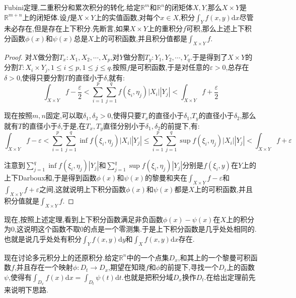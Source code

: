 Fubini定理,二重积分和累次积分的转化.给定$\mathbb{R}^m$和$\mathbb{R}^n$的闭矩体$X,Y$,那么$X\times Y$是$\mathbb{R}^{m+n}$上的闭矩体.设$f$是$X\times Y$上的实值函数,对每个$x\in X$,积分$\int_Yf(x,y)\mathrm{d}x$尽管未必存在,但是存在上下积分.先断言,如果$X\times Y$上的重积分$f$可积,那么上述上下积分函数$\phi(x)$和$\psi(x)$总是$X$上的可积函数,并且积分值都是$\int_{X\times Y}f$.
\begin{proof}
	
	对$X$做分割$T_x:X_1,X_2,\cdots,X_p$,对$Y$做分割$T_y:Y_1,Y_2,\cdots,Y_q$.于是得到了$X\times Y$的分割$T:X_i\times Y_j,1\le i\le p,1\le j\le q$.按照$f$是可积函数,于是对任意的$\varepsilon>0$,总存在$\delta>0$,使得只要分割$T$的直径小于$\delta$,就有:
	$$\int_{X\times Y}f-\frac{\varepsilon}{2}<\sum_{i=1}^{p}\sum_{j=1}^{q}f(\xi_i,\eta_j)|X_i||Y_j|<\int_{X\times Y}f+\frac{\varepsilon}{2}$$
	
	现在按照$m,n$固定,可以取$\delta_1,\delta_2>0$,使得只要$T_x$的直径小于$\delta_1$,$T_y$的直径小于$\delta_2$,那么就有$T$的直径小于$\delta$,于是,在$T_x,T_y$直径分别小于$\delta_1,\delta_2$的前提下,有:
	$$\int_{X\times Y}f-\varepsilon<\sum_{i=1}^{p}\sum_{j=1}^{q}\inf f(\xi_i,\eta_j)|X_i||Y_j|\le\sum_{i=1}^{p}\sum_{j=1}^{q}\sup f(\xi_i,\eta_j)|X_i||Y_j|<\int_{X\times Y}f+\varepsilon$$
	
	注意到$\sum_{j=1}^{q}\inf f(\xi_i,\eta_j)|Y_j|$和$\sum_{j=1}^{q}\sup f(\xi_i,\eta_j)|Y_j|$分别是$f(\xi_i,y)$在$Y$上的上下Darboux和,于是得到函数$\phi(x)$和$\psi(x)$的黎曼和夹在$\int_{X\times Y}f-\varepsilon$和$\int_{X\times Y}f+\varepsilon$之间,这就说明上下积分函数$\phi(x)$和$\psi(x)$都是$X$上的可积函数,并且积分值就是$\int_{X\times Y}f$.
	
\end{proof}

现在,按照上述定理,看到上下积分函数满足非负函数$\phi(x)-\psi(x)$在$X$上的积分为0,这说明这个函数不取0的点是一个零测集.于是上下积分函数是几乎处处相同的.也就是说几乎处处有积分$\int_Yf(x,y)\mathrm{d}y$和$\int_Xf(x,y)\mathrm{d}x$存在.

现在讨论多元积分上的还原积分.给定$\mathbb{R}^n$中的一个点集$D_x$,和其上的一个黎曼可积函数$f$,并且存在一个映射$\phi:D_t\to D_x$,期望在知晓$f$和$\phi$的前提下,寻找一个$D_t$上的函数$\psi$,使得有$\int_{D_x}f(x)\mathrm{d}x=\int_{D_t}\psi(t)\mathrm{d}t$.也就是把积分域$D_x$换作$D_t$.在给出定理前先来说明下思路.

